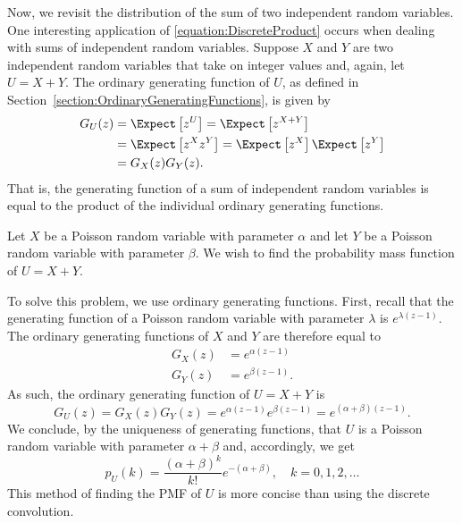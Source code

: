 Now, we revisit the distribution of the sum of two independent random variables.
One interesting application of \eqref{equation:DiscreteProduct} occurs when dealing with sums of independent random variables.
Suppose $X$ and $Y$ are two independent random variables that take on integer values and, again, let $U = X + Y$.
The ordinary generating function of $U$, as defined in Section~\ref{section:OrdinaryGeneratingFunctions}, is given by
\begin{equation*}
\begin{split}
G_U (z) &= \Expect \left[ z^U \right]
= \Expect \left[ z^{X + Y} \right] \\
&= \Expect \left[ z^X z^Y \right]
= \Expect \left[ z^X \right] \Expect \left[ z^Y \right] \\
&= G_X(z) G_Y(z) .
\end{split}
\end{equation*}
That is, the generating function of a sum of independent random variables is equal to the product of the individual ordinary generating functions.

\begin{example}
Let $X$ be a Poisson random variable with parameter $\alpha$ and let $Y$ be a Poisson random variable with parameter $\beta$.
We wish to find the probability mass function of $U = X + Y$.

To solve this problem, we use ordinary generating functions.
First, recall that the generating function of a Poisson random variable with parameter $\lambda$ is $e^{\lambda (z-1)}$.
The ordinary generating functions of $X$ and $Y$ are therefore equal to
\begin{align*}
G_X (z) &= e^{\alpha (z-1)} \\
G_Y (z) &= e^{\beta (z-1)} .
\end{align*}
As such, the ordinary generating function of $U = X + Y$ is
\begin{equation*}
G_U (z) = G_X (z) G_Y(z) = e^{\alpha (z-1)} e^{\beta (z-1)}
= e^{(\alpha + \beta) (z-1)} .
\end{equation*}
We conclude, by the uniqueness of generating functions, that $U$ is a Poisson random variable with parameter $\alpha + \beta$ and, accordingly, we get
\begin{equation*}
p_U (k) = \frac{ (\alpha + \beta)^k }{k!} e^{- (\alpha + \beta) },
\quad k = 0, 1, 2, \ldots
\end{equation*}
This method of finding the PMF of $U$ is more concise than using the discrete convolution.
\end{example}


